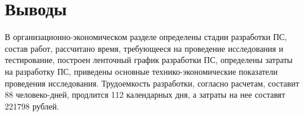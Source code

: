 \newpage
\section{Выводы}
В организационно-экономическом разделе определены стадии разработки ПС, состав работ, рассчитано время, требующееся на
проведение исследования и тестирование, построен ленточный график разработки ПС, определены затраты на разработку ПС,
приведены основные технико-экономические показатели проведения исследования.
Трудоемкость разработки, согласно расчетам, составит 88 человеко-дней, продлится 112 календарных дня, а затраты на
нее составят 221798 рублей.

\newpage
